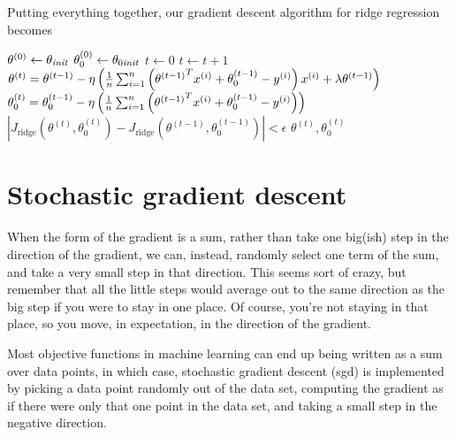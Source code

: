 Putting everything together, our gradient descent algorithm for ridge
regression becomes
\begin{codebox}
  \li $\theta^{(0)} \gets \theta_{\it init}$
  \li $\theta_0^{(0)} \gets \theta_{0 {\it init}}$
  \li $t \gets 0$
  \li \Repeat
  \li   $t \gets t+1$
  \li   $\theta^{(t)} = \theta^{(t-1)} - \eta\left(\frac{1}{n}\sum_{i=1}^n
    \left({\theta^{(t-1)}}^T x^{(i)} + \theta_0^{(t-1)} -
      y^{(i)}\right) x^{(i)}
    + \lambda\theta^{(t-1)}
    \right)$
  \li   $\theta_0^{(t)} = \theta_0^{(t-1)} - \eta\left(\frac{1}{n}\sum_{i=1}^n
    \left({\theta^{(t-1)}}^T x^{(i)} + \theta_0^{(t-1)} -
      y^{(i)} \right)
    \right)$
  \li \Until $\left| J_{\text{ridge}}(\theta^{(t)},\theta_0^{(t)}) - J_{\text{ridge}}(\theta^{(t-1)},
    \theta_0^{(t-1)}) \right| <\epsilon$
  \li \Return $\theta^{(t)},\theta_0^{(t)}$
\end{codebox}

\section{Stochastic gradient descent}

\label{sec-sgd}

When the form of the gradient is a sum, rather than take one big(ish)
step in the direction of the gradient, we can, instead,
randomly 
select one term of the sum, and take a very small step in that
direction.  This seems sort of crazy,  but remember that all the
little steps would average out to the same direction as the big step
if you were to stay in one place.   Of course, you're not staying in
that place,  so you move, in expectation, in the direction of the
gradient.

Most objective functions in machine learning can end up being written
as a sum over data points, in which case, stochastic gradient descent
({\sc sgd}) is implemented by picking a data point randomly out of the
data set, computing the gradient as if there were only that one point
in the data set, and taking a small step  in the negative direction.

